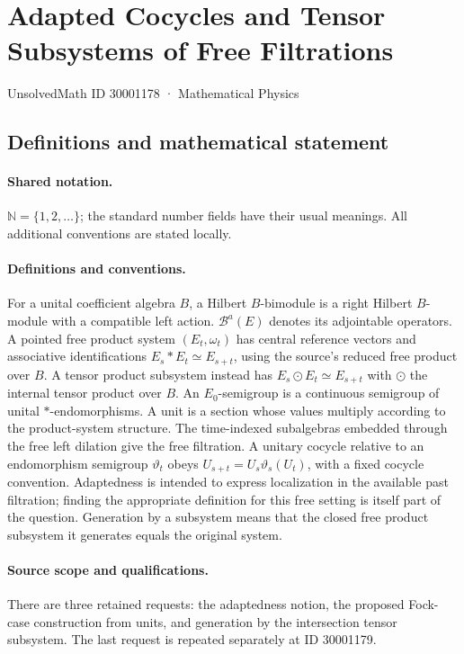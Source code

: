 \documentclass[11pt]{article}
\begin{document}
\setcounter{section}{30001177}
\section{Adapted Cocycles and Tensor Subsystems of Free Filtrations}\label{30001178}
{\small UnsolvedMath ID 30001178 · Mathematical Physics}
\subsection{Definitions and mathematical statement}

\paragraph{Shared notation.}$\mathbb N=\{1,2,\ldots\}$; the standard number fields have their usual meanings. All additional conventions are stated locally.


\paragraph{Definitions and conventions.} For a unital coefficient algebra $B$, a Hilbert $B$-bimodule is a right Hilbert $B$-module with a compatible left action. $\mathcal B^a(E)$ denotes its adjointable operators. A pointed free product system $(E_t,\omega_t)$ has central reference vectors and associative identifications $E_s*E_t\simeq E_{s+t}$, using the source's reduced free product over $B$. A tensor product subsystem instead has $E_s\odot E_t\simeq E_{s+t}$ with $\odot$ the internal tensor product over $B$. An $E_0$-semigroup is a continuous semigroup of unital $*$-endomorphisms. A unit is a section whose values multiply according to the product-system structure. The time-indexed subalgebras embedded through the free left dilation give the free filtration. A unitary cocycle relative to an endomorphism semigroup $\vartheta_t$ obeys $U_{s+t}=U_s\vartheta_s(U_t)$, with a fixed cocycle convention. Adaptedness is intended to express localization in the available past filtration; finding the appropriate definition for this free setting is itself part of the question. Generation by a subsystem means that the closed free product subsystem it generates equals the original system.

\paragraph{Source scope and qualifications.} There are three retained requests: the adaptedness notion, the proposed Fock-case construction from units, and generation by the intersection tensor subsystem. The last request is repeated separately at ID 30001179.
\end{document}
